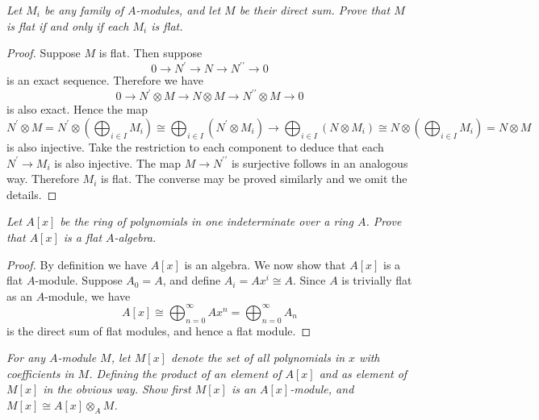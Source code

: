 \begin{problem}\em
Let $M_i$ be any family of $A$-modules, and let $M$ be their direct sum. Prove that $M$ is flat if and only if each $M_i$ is flat.
\end{problem}
\begin{proof}
Suppose $M$ is flat. Then suppose 
$$
0\longrightarrow N^{\prime}\longrightarrow N\longrightarrow N^{\prime\prime}\longrightarrow 0
$$
is an exact sequence. Therefore we have 
$$
0\longrightarrow N^{\prime}\otimes M\longrightarrow N\otimes M\longrightarrow N^{\prime\prime}\otimes M\longrightarrow 0
$$
is also exact. Hence the map 
$$
N^{\prime}\otimes M=N^{\prime}\otimes \left( \bigoplus_{i\in I}{M_i} \right) \cong \bigoplus_{i\in I}{\left( N^{\prime}\otimes M_i \right)}\rightarrow \bigoplus_{i\in I}{\left( N\otimes M_i \right)}\cong N\otimes \left( \bigoplus_{i\in I}{M_i} \right) =N\otimes M
$$
is also injective. Take the restriction to each component to deduce that each $N^\prime\to M_i$ is also injective. The map $M\to N^{\prime\prime}$ is surjective follows in an analogous way. Therefore $M_i$ is flat. The converse may be proved similarly and we omit the details.
\end{proof}
\begin{problem}\em
Let $A[x]$ be the ring of polynomials in one indeterminate over a ring $A$. Prove that $A[x]$ is a flat $A$-algebra.
\end{problem}
\begin{proof}
By definition we have $A[x]$ is an algebra. We now show that $A[x]$ is a flat $A$-module. Suppose $A_0=A$, and define $A_i=Ax^i\cong A$. Since $A$ is trivially flat as an $A$-module, we have 
$$
A\left[ x \right] \cong \bigoplus_{n=0}^{\infty}{Ax^n}=\bigoplus_{n=0}^{\infty}{A_n}
$$
is the direct sum of flat modules, and hence a flat module.
\end{proof}
\begin{problem}\em
For any $A$-module $M$, let $M[x]$ denote the set of all polynomials in $x$ with coefficients in $M$. Defining the product of an element of $A[x]$ and as element of $M[x]$ in the obvious way. Show first $M[x]$ is an $A[x]$-module, and $M[x]\cong A[x]\otimes_AM$.
\end{problem}